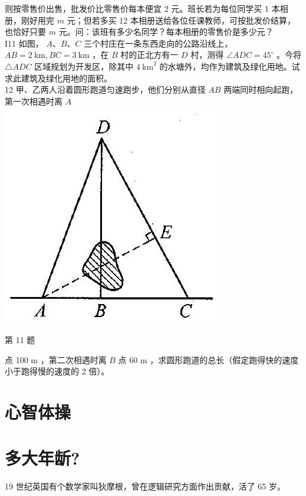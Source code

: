 \documentclass[10pt]{article}
\begin{document}
则按零售价出售，批发价比零售价每本便宜 2 元。班长若为每位同学买 1 本相册，刚好用完 $m$ 元；但若多买 12 本相册送给各位任课教师，可按批发价结算，也恰好只要 $m$ 元。问：该班有多少名同学？每本相册的零售价是多少元？\\
I11 如图， $A 、 B 、 C$ 三个村庄在一条东西走向的公路沿线上， $A B=2 \mathrm{~km}, B C=3 \mathrm{~km}$ ，在 $B$ 村的正北方有一 $D$ 村，测得 $\angle A D C=45^{\circ}$ 。今将 $\triangle A D C$ 区域规划为开发区，除其中 $4 \mathrm{~km}^{2}$ 的水塘外，均作为建筑及绿化用地。试求此建筑及绿化用地的面积。\\
12 甲、乙两人沿着圆形跑道匀速跑步，他们分别从直径 $A B$ 两端同时相向起跑，第一次相遇时离 $A$\\
\includegraphics[max width=\textwidth, center]{2024_10_30_26b590fd1106d28139f0g-121}

第 11 题

点 100 m ，第二次相遇时离 $B$ 点 60 m ，求圆形跑道的总长（假定跑得快的速度小于跑得慢的速度的 2 倍）。

\section*{心智体操}
\section*{多大年龂?}
19 世纪英国有个数学家叫狄摩根，曾在逻辑研究方面作出贡献，活了 65 岁。
\end{document}
